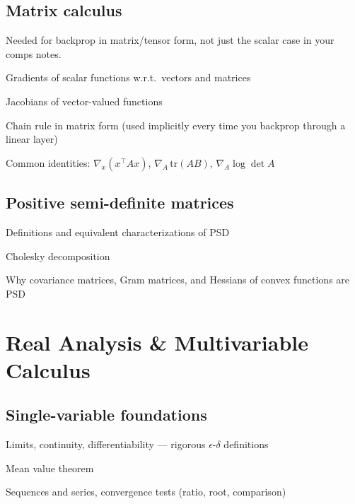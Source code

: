 \documentclass[11pt]{article}
\newcommand{\note}[1]{\textcolor{gray!70!black}{\small #1}}
\begin{document}
\subsection{Matrix calculus}
\note{Needed for backprop in matrix/tensor form, not just the scalar case in your comps notes.}
\begin{tasklist}
    \item Gradients of scalar functions w.r.t.\ vectors and matrices
    \item Jacobians of vector-valued functions
    \item Chain rule in matrix form (used implicitly every time you backprop through a linear layer)
    \item Common identities: $\nabla_x (x^\top A x)$, $\nabla_A \,\text{tr}(AB)$, $\nabla_A \log\det A$
\end{tasklist}

\subsection{Positive semi-definite matrices}
\begin{tasklist}
    \item Definitions and equivalent characterizations of PSD
    \item Cholesky decomposition
    \item Why covariance matrices, Gram matrices, and Hessians of convex functions are PSD
\end{tasklist}

\section{Real Analysis \& Multivariable Calculus}

\subsection{Single-variable foundations}
\begin{tasklist}
    \item Limits, continuity, differentiability — rigorous $\epsilon$-$\delta$ definitions
    \item Mean value theorem
    \item Sequences and series, convergence tests (ratio, root, comparison)
\end{tasklist}
\end{document}
